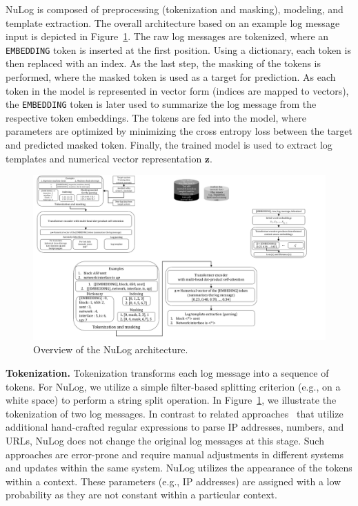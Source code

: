 NuLog is composed of preprocessing (tokenization and masking), modeling, and template extraction. The overall architecture based on an example log message input is depicted in Figure~\ref{fig:nulog}. The raw log messages are tokenized, where an \texttt{EMBEDDING} token is inserted at the first position. Using a dictionary, each token is then replaced with an index. As the last step, the masking of the tokens is performed, where the masked token is used as a target for prediction. As each token in the model is represented in vector form (indices are mapped to vectors), the \texttt{EMBEDDING} token is later used to summarize the log message from the respective token embeddings. The tokens are fed into the model, where parameters are optimized by minimizing the cross entropy loss between the target and predicted masked token. Finally, the trained model is used to extract log templates and numerical vector representation $\mathbf{z}$.

\begin{figure}[!t]
\centerline{\includegraphics[width=1.0\textwidth]{gfx/chap5/nulog.pdf}}
\caption{Overview of the NuLog architecture.}
\label{fig:nulog}
\end{figure}

\textbf{Tokenization.} Tokenization transforms each log message into a sequence of tokens. For NuLog, we utilize a simple filter-based splitting criterion (e.g., on a white space) to perform a string split operation. In Figure~\ref{fig:nulog}, we illustrate the tokenization of two log messages. In contrast to related approaches~\cite{zhu2019tools} that utilize additional hand-crafted regular expressions to parse IP addresses, numbers, and URLs, NuLog does not change the original log messages at this stage. Such approaches are error-prone and require manual adjustments in different systems and updates within the same system. NuLog utilizes the appearance of the tokens within a context. These parameters (e.g., IP addresses) are assigned with a low probability as they are not constant within a particular context.

